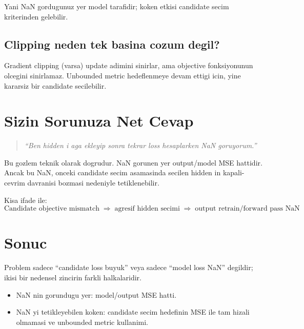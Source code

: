 \documentclass[12pt,a4paper]{article}
\begin{document}
Yani NaN gordugunuz yer model tarafidir; koken etkisi candidate secim kriterinden gelebilir.

\subsection{Clipping neden tek basina cozum degil?}
Gradient clipping (varsa) update adimini sinirlar,
ama objective fonksiyonunun olcegini sinirlamaz.
Unbounded metric hedeflenmeye devam ettigi icin, yine kararsiz bir candidate secilebilir.

\section{Sizin Sorunuza Net Cevap}
\begin{quote}
\textit{``Ben hidden i aga ekleyip sonra tekrar loss hesaplarken NaN goruyorum.''}
\end{quote}

Bu gozlem teknik olarak dogrudur.
NaN gorunen yer output/model MSE hattidir.
Ancak bu NaN, onceki candidate secim asamasinda secilen hidden in
kapali-cevrim davranisi bozmasi nedeniyle tetiklenebilir.

Kisa ifade ile:
\begin{equation}
\text{Candidate objective mismatch} \;\Longrightarrow\; \text{agresif hidden secimi}
\;\Longrightarrow\; \text{output retrain/forward pass NaN}
\end{equation}

\section{Sonuc}
Problem sadece ``candidate loss buyuk'' veya sadece ``model loss NaN'' degildir;
ikisi bir nedensel zincirin farkli halkalaridir.

\begin{itemize}
    \item NaN nin gorundugu yer: model/output MSE hatti.
    \item NaN yi tetikleyebilen koken: candidate secim hedefinin MSE ile tam hizali olmamasi ve unbounded metric kullanimi.
\end{itemize}
\end{document}

